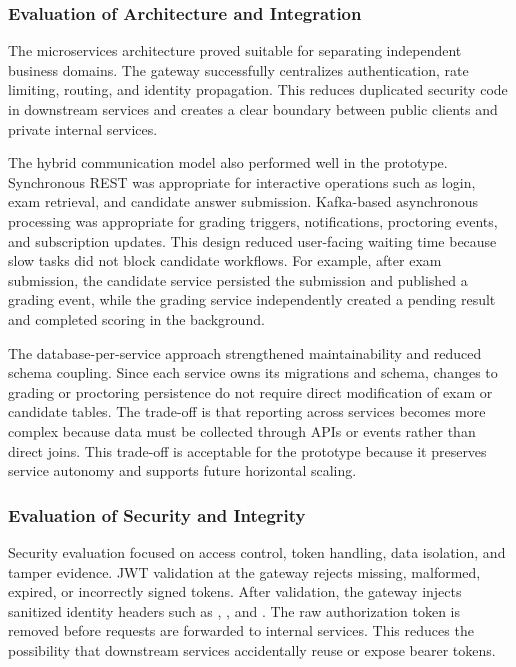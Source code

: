 \subsubsection{Evaluation of Architecture and Integration}
The microservices architecture proved suitable for separating independent business domains. The gateway successfully centralizes authentication, rate limiting, routing, and identity propagation. This reduces duplicated security code in downstream services and creates a clear boundary between public clients and private internal services.

The hybrid communication model also performed well in the prototype. Synchronous REST was appropriate for interactive operations such as login, exam retrieval, and candidate answer submission. Kafka-based asynchronous processing was appropriate for grading triggers, notifications, proctoring events, and subscription updates. This design reduced user-facing waiting time because slow tasks did not block candidate workflows. For example, after exam submission, the candidate service persisted the submission and published a grading event, while the grading service independently created a pending result and completed scoring in the background.

The database-per-service approach strengthened maintainability and reduced schema coupling. Since each service owns its migrations and schema, changes to grading or proctoring persistence do not require direct modification of exam or candidate tables. The trade-off is that reporting across services becomes more complex because data must be collected through APIs or events rather than direct joins. This trade-off is acceptable for the prototype because it preserves service autonomy and supports future horizontal scaling.

\subsubsection{Evaluation of Security and Integrity}
Security evaluation focused on access control, token handling, data isolation, and tamper evidence. JWT validation at the gateway rejects missing, malformed, expired, or incorrectly signed tokens. After validation, the gateway injects sanitized identity headers such as , , and . The raw authorization token is removed before requests are forwarded to internal services. This reduces the possibility that downstream services accidentally reuse or expose bearer tokens.

